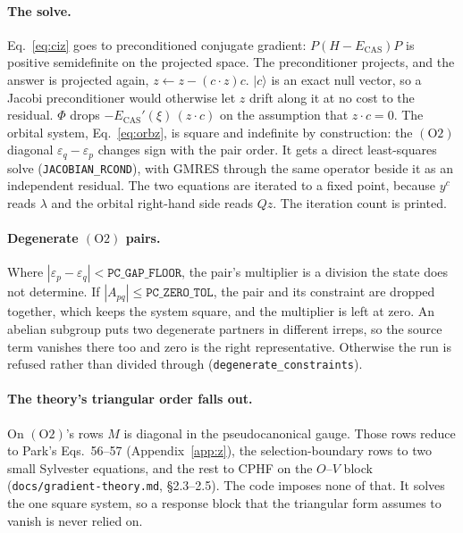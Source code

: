 \documentclass[11pt]{article}
\newcommand{\code}[1]{\texttt{#1}}
\newcommand{\eps}{\varepsilon}
\newcommand{\Ecas}{E_{\mathrm{CAS}}}
\newcommand{\cons}[1]{\ensuremath{(\mathrm{#1})}}
\begin{document}
\paragraph{The solve.} Eq.~\eqref{eq:ciz} goes to preconditioned conjugate
gradient: $P(H-\Ecas)P$ is positive semidefinite on the projected space. The
preconditioner projects, and the answer is projected again, $z \gets z -
(c\cdot z)c$. $|c\rangle$ is an exact null vector, so a Jacobi preconditioner
would otherwise let $z$ drift along it at no cost to the residual. $\Phi$ drops
$-\Ecas'(\xi)\,(z\cdot c)$ on the assumption that $z\cdot c = 0$. The orbital
system, Eq.~\eqref{eq:orbz}, is square and indefinite by construction: the
\cons{O2} diagonal $\varepsilon_q - \varepsilon_p$ changes sign with the pair
order. It gets a direct least-squares solve (\code{JACOBIAN\_RCOND}), with
GMRES through the same operator beside it as an independent residual. The two
equations are iterated to a fixed point, because $y^c$ reads $\lambda$ and the
orbital right-hand side reads $Qz$. The iteration count is printed.

\paragraph{Degenerate \cons{O2} pairs.} Where $|\eps_p - \eps_q| <
\code{PC\_GAP\_FLOOR}$, the pair's multiplier is a division the state does not
determine. If $|A_{pq}| \le \code{PC\_ZERO\_TOL}$, the pair and its constraint
are dropped together, which keeps the system square, and the multiplier is
left at zero. An abelian subgroup puts two degenerate partners in different
irreps, so the source term vanishes there too and zero is the right
representative. Otherwise the run is refused rather than divided through
(\code{degenerate\_constraints}).

\paragraph{The theory's triangular order falls out.} On \cons{O2}'s rows $M$
is diagonal in the pseudocanonical gauge. Those rows reduce to Park's
Eqs.~56--57 (Appendix~\ref{app:z}), the selection-boundary rows to two small
Sylvester equations, and the rest to CPHF on the $O$--$V$ block
(\code{docs/gradient-theory.md}, \S2.3--2.5). The code imposes none of that.
It solves the one square system, so a response block that the triangular form
assumes to vanish is never relied on.
\end{document}
